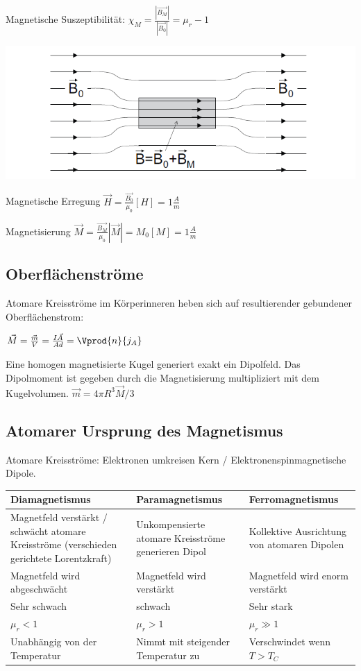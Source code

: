 \documentclass[10pt,a4paper]{scrartcl}
\begin{document}
\begin{multicols*}{3}
	Magnetische Suszeptibilität: $\chi_M=\frac{|\vec{B_M}|}{|\vec{B_0}|}=\mu_r-1$
	\vspace{1ex}
	
	\includegraphics[width=\linewidth]{MagSusz}
	
	Magnetische Erregung \hspace{1ex} $\vec{H}=\frac{\vec{B_0}}{\mu_0}$\hfill $[H]=1\frac{A}{m}$
	
	Magnetisierung \hspace{1ex} $\vec{M}=\frac{\vec{B_M}}{\mu_0}$\hfill$|\vec{M}|=M_0$\hfill$[M]=1\frac{A}{m}$
		\subsection{Oberflächenströme}
	
	
	Atomare Kreisströme im Körperinneren heben sich auf \dahe resultierender gebundener Oberflächenstrom:
	
	$\vec{M}=\frac{\vec{m}}{V}=\frac{I\vec{A}}{Ad}=\Vprod{n}{j_A}$
	
	Eine homogen magnetisierte Kugel generiert exakt ein Dipolfeld. Das Dipolmoment
ist gegeben durch die Magnetisierung multipliziert mit dem Kugelvolumen. $\vec{m}=4\pi R^3\vec{M}/3$
	
	\subsection{Atomarer Ursprung des Magnetismus}
	
	
	Atomare Kreisströme: Elektronen umkreisen Kern / Elektronenspin\dahe magnetische Dipole.
	
	
	\begin{tabulary}{\linewidth}{L|L|L}
	Diamagnetismus	&	Paramagnetismus	&	Ferromagnetismus\\
	\hline
	Magnetfeld verstärkt / schwächt atomare Kreisströme (verschieden gerichtete Lorentzkraft)	&	Unkompensierte atomare Kreisströme generieren Dipol	&	Kollektive Ausrichtung von atomaren Dipolen\\
	\hline
	Magnetfeld wird abgeschwächt	&	Magnetfeld wird verstärkt	&	Magnetfeld wird enorm verstärkt\\
	\hline
	Sehr schwach	&	schwach	&	Sehr stark\\
	\hline
	$\mu_r<1$	&	$\mu_r>1$	&	$\mu_r\gg 1$\\	
	\hline
	Unabhängig von der Temperatur	&	Nimmt mit steigender Temperatur zu	&	Verschwindet wenn $T>T_C$\\	
	\hline
	

\end{tabulary}
\end{multicols*}
\end{document}
